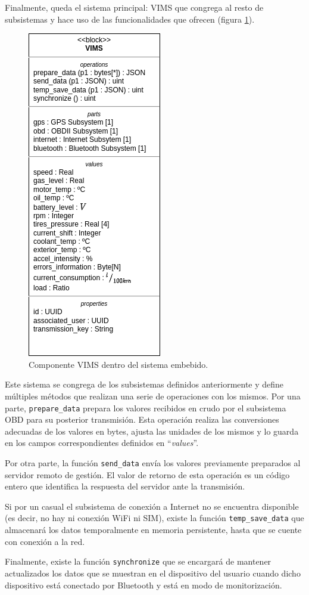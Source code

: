 Finalmente, queda el sistema principal: \ac{VIMS} que congrega al resto de subsistemas
y hace uso de las funcionalidades que ofrecen (figura \ref{fig:bd-vims}).

\begin{figure}[H]
  \centering
  \includegraphics[width=.3\linewidth]{images/BD-VIMS.png}
  \caption{Componente \ac{VIMS} dentro del sistema embebido.}
  \label{fig:bd-vims}
\end{figure}

Este sistema se congrega de los subsistemas definidos anteriormente y define múltiples
métodos que realizan una serie de operaciones con los mismos. Por una parte, \texttt{prepare\_data}
prepara los valores recibidos en crudo por el subsistema \ac{OBD} para su posterior
transmisión. Esta operación realiza las conversiones adecuadas de los valores en
bytes, ajusta las unidades de los mismos y lo guarda en los campos correspondientes
definidos en ``\textit{values}''.

Por otra parte, la función \texttt{send\_data} envía los valores previamente preparados
al servidor remoto de gestión. El valor de retorno de esta operación es un código
entero que identifica la respuesta del servidor ante la transmisión.

Si por un casual el subsistema de conexión a Internet no se encuentra disponible
(es decir, no hay ni conexión WiFi ni SIM), existe la función \texttt{temp\_save\_data}
que almacenará los datos temporalmente en memoria persistente, hasta que se cuente
con conexión a la red.

Finalmente, existe la función \texttt{synchronize} que se encargará de mantener
actualizados los datos que se muestran en el dispositivo del usuario cuando dicho
dispositivo está conectado por Bluetooth y está en modo de monitorización.

